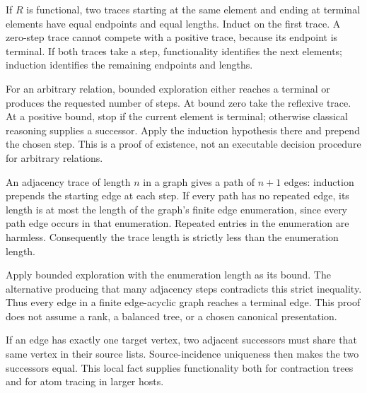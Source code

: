 If $R$ is functional, two traces starting at the same element and ending
at terminal elements have equal endpoints and equal lengths. Induct on the
first trace. A zero-step trace cannot compete with a positive trace, because
its endpoint is terminal. If both traces take a step, functionality identifies
the next elements; induction identifies the remaining endpoints and lengths.

For an arbitrary relation, bounded exploration either reaches a terminal
or produces the requested number of steps. At bound zero take the reflexive
trace. At a positive bound, stop if the current element is terminal;
otherwise classical reasoning supplies a successor. Apply the induction
hypothesis there and prepend the chosen step. This is a proof of existence,
not an executable decision procedure for arbitrary relations.



An adjacency trace of length $n$ in a graph gives a path of $n+1$ edges:
induction prepends the starting edge at each step. If every path has no
repeated edge, its length is at most the length of the graph's finite edge
enumeration, since every path edge occurs in that enumeration. Repeated
entries in the enumeration are harmless. Consequently the trace length is
strictly less than the enumeration length.

Apply bounded exploration with the enumeration length as its bound. The
alternative producing that many adjacency steps contradicts this strict
inequality. Thus every edge in a finite edge-acyclic graph reaches a terminal
edge. This proof does not assume a rank, a balanced tree, or a chosen
canonical presentation.




If an edge has exactly one target vertex, two adjacent successors must
share that same vertex in their source lists. Source-incidence uniqueness
then makes the two successors equal. This local fact supplies functionality
both for contraction trees and for atom tracing in larger hosts.


